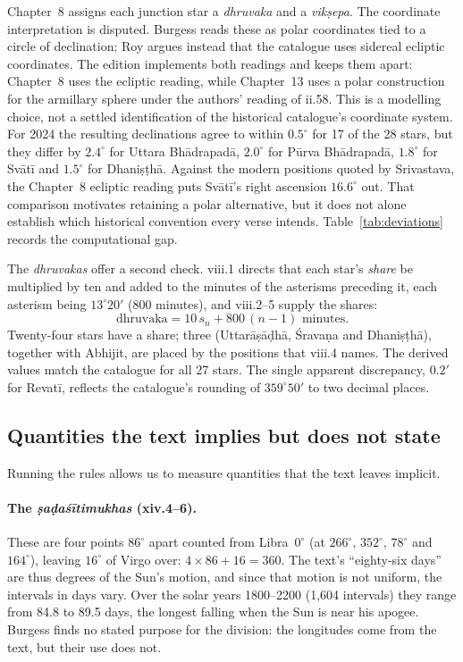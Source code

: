 \documentclass[11pt,a4paper]{article}
\begin{document}
Chapter~8 assigns each junction star a \textit{dhruvaka} and a \textit{vik\d{s}epa}. The coordinate interpretation is disputed. Burgess reads these as polar coordinates tied to a circle of declination; Roy \citep{roy2019} argues instead that the catalogue uses sidereal ecliptic coordinates. The edition implements both readings and keeps them apart: Chapter~8 uses the ecliptic reading, while Chapter~13 uses a polar construction for the armillary sphere under the authors' reading of ii.58. This is a modelling choice, not a settled identification of the historical catalogue's coordinate system. For 2024 the resulting declinations agree to within $0.5^\circ$ for 17 of the 28 stars, but they differ by $2.4^\circ$ for Uttara Bh\=adrapad\=a, $2.0^\circ$ for P\=urva Bh\=adrapad\=a, $1.8^\circ$ for Sv\=at\=i and $1.5^\circ$ for Dhani\d{s}\d{t}h\=a. Against the modern positions quoted by Srivastava, the Chapter~8 ecliptic reading puts Sv\=at\=i's right ascension $16.6^\circ$ out. That comparison motivates retaining a polar alternative, but it does not alone establish which historical convention every verse intends. Table~\ref{tab:deviations} records the computational gap.

The \textit{dhruvakas} offer a second check. viii.1 directs that each star's \emph{share} be multiplied by ten and added to the minutes of the asterisms preceding it, each asterism being $13^\circ20'$ (800 minutes), and viii.2--5 supply the shares:
\[
  \text{dhruvaka} = 10\,s_n + 800\,(n-1) \text{ minutes}.
\]
Twenty-four stars have a share; three (Uttar\=a\d{s}\=a\d{d}h\=a, \'Srava\d{n}a and Dhani\d{s}\d{t}h\=a), together with Abhijit, are placed by the positions that viii.4 names. The derived values match the catalogue for all 27 stars. The single apparent discrepancy, $0.2'$ for Revat\=i, reflects the catalogue's rounding of $359^\circ50'$ to two decimal places.

\subsection{Quantities the text implies but does not state}
\label{sec:implicit}

Running the rules allows us to measure quantities that the text leaves implicit.

\paragraph{The \textit{\d{s}a\d{d}a\'s\=itimukhas} (xiv.4--6).} These are four points $86^\circ$ apart counted from Libra~$0^\circ$ (at $266^\circ$, $352^\circ$, $78^\circ$ and $164^\circ$), leaving $16^\circ$ of Virgo over: $4\times86+16=360$. The text's ``eighty-six days'' are thus degrees of the Sun's motion, and since that motion is not uniform, the intervals in days vary. Over the solar years 1800--2200 (1,604 intervals) they range from 84.8 to 89.5 days, the longest falling when the Sun is near his apogee. Burgess finds no stated purpose for the division: the longitudes come from the text, but their use does not.
\end{document}
